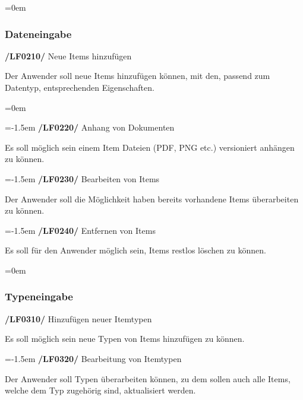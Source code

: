 \documentclass[11pt,a4paper]{report}
\begin{document}
\leftskip=0em
\subsubsection{Dateneingabe}
\textbf{/LF0210/} Neue Items hinzufügen
\par
\begingroup
\leftskip=1cm
\noindent Der Anwender soll neue Items hinzufügen können, mit den, passend zum Datentyp, entsprechenden Eigenschaften.\\
\par
\endgroup

\leftskip=0em

\leftskip=-1.5em
\textbf{/LF0220/} Anhang von Dokumenten
\par
\begingroup
\leftskip=1cm
\noindent Es soll möglich sein einem Item Dateien (PDF, PNG etc.) versioniert anhängen zu können.\\
\par
\endgroup

\leftskip=-1.5em
\textbf{/LF0230/} Bearbeiten von Items
\par
\begingroup
\leftskip=1cm
\noindent Der Anwender soll die Möglichkeit haben bereits vorhandene Items überarbeiten zu können.\\
\par
\endgroup

\leftskip=-1.5em
\textbf{/LF0240/} Entfernen von Items
\par
\begingroup
\leftskip=1cm
\noindent Es soll für den Anwender möglich sein, Items restlos löschen zu können.\\
\par
\endgroup

\leftskip=0em
\subsubsection{Typeneingabe}

\textbf{/LF0310/} Hinzufügen neuer Itemtypen
\par
\begingroup
\leftskip=1cm
\noindent Es soll möglich sein neue Typen von Items hinzufügen zu können.\\
\par
\endgroup

\leftskip=-1.5em
\textbf{/LF0320/} Bearbeitung von Itemtypen
\par
\begingroup
\leftskip=1cm
\noindent Der Anwender soll Typen überarbeiten können, zu dem sollen auch alle Items, welche dem Typ zugehörig sind, aktualisiert werden.\\
\par
\endgroup
\end{document}
